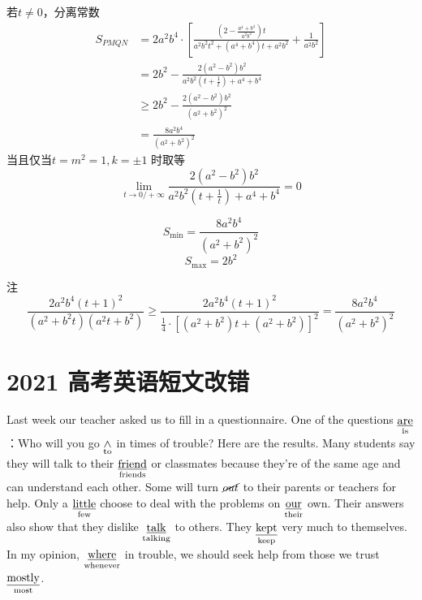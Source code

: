\documentclass[UTF8]{article}
\begin{document}
若$t \ne   0$，分离常数
$$
\begin{aligned}
 {S_{PMQN}}& = 2{a^2}{b^4} \cdot \left[ {\frac{{\left( {2 - \frac{{{a^4} + {b^4}}}{{{a^2}{b^2}}}} \right)t}}{{{a^2}{b^2}{t^2} + ({a^4} + {b^4})t + {a^2}{b^2}}} + \frac{1}{{{a^2}{b^2}}}} \right]
 \\&=2{b^2} - \frac{{2({a^2} - {b^2}){b^2}}}{{{a^2}{b^2}\left( {t + \frac{1}{t}} \right) + {a^4} + {b^4}}}
 \\&\ge 2{b^2} - \frac{{2({a^2} - {b^2}){b^2}}}{{{{({a^2} + {b^2})}^2}}}
 \\&=\frac{{8{a^2}{b^4}}}{{{{({a^2} + {b^2})}^2}}}
\end{aligned}
$$
当且仅当$t=m^2=1,k=\pm 1$ 时取等
$$
\lim_{t \to 0/+\infty} \frac{{2({a^2} - {b^2}){b^2}}}{{{a^2}{b^2}\left( {t + \frac{1}{t}} \right) + {a^4} + {b^4}}}=0
$$

$$
  {S_{{\text{min}}}}=\frac{{8{a^2}{b^4}}}{{{{({a^2} + {b^2})}^2}}}
  $$
$$
  {S_{{\text{max}}}}  = 2{b^2}
$$

注
$$
\frac{{2{a^2}{b^4}{{({t} + 1)}^2}}}{{({a^2} + {b^2}{t})({a^2}{t} + {b^2})}}\ge\frac{{2{a^2}{b^4}{{(t + 1)}^2}}}{{\frac{1}{4} \cdot {{[({a^2} + {b^2})t + ({a^2} + {b^2})]}^2}}}=\frac{{8{a^2}{b^4}}}{{{{({a^2} + {b^2})}^2}}}
$$
\section{2021 高考英语短文改错}

Last week our teacher asked us to fill in a questionnaire. One of the questions $\rm\underset{is}{\underline{are}}$：Who will you go $\rm \underset{to}{\wedge}\\$ in times of trouble? Here are the results. Many students say they will talk to their $\rm \underset{friends}{\underline{friend}}$ or classmates because they're of the same age and can understand each other. Some will turn $\rm \cancel{out}$ to their parents or teachers for help. Only a $\rm \underset{few}{\underline{little}}$ choose to deal with the problems on $\rm \underset{their}{\underline{our}}$ own. Their answers also show that they dislike $\rm \underset{talking}{\underline{talk}}$ to others. They $\rm \underset{keep}{\underline{kept}}$ very much to themselves. In my opinion, $\rm \underset{whenever}{\underline{where}}$ in trouble, we should seek help from those we trust $\rm \underset{most}{\underline{mostly}}$.


\end{document}
